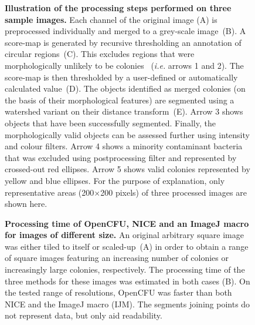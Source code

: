 \documentclass[10pt]{article}
\newcommand{\IJM}{IJM}
\begin{document}
\newpage{}

\begin{figure}[!ht]
\begin{center}
\end{center}
\caption{{\bf Illustration of the processing steps performed on three sample images.}
Each channel of the original image (A) is preprocessed individually and merged
to a grey-scale image~(B).
A score-map is generated by recursive thresholding an annotation of circular regions~(C). 
This excludes regions that were morphologically unlikely to be colonies~
(\emph{i.e.} arrows 1 and 2).
The score-map is then thresholded by a user-defined or automatically calculated
value~(D).
The objects identified as merged colonies (on the basis of their morphological
features) are segmented using a watershed variant on their distance transform~(E).
Arrow 3 shows objects that have been successfully segmented. Finally, the morphologically valid objects can be assessed further using intensity and colour filters.
Arrow 4 shows a minority contaminant bacteria that was excluded using postprocessing filter and represented by crossed-out red ellipses. 
Arrow 5 shows valid colonies represented by yellow and blue ellipses.
For the purpose of explanation, only representative areas (200$\times{}$200 pixels)
of three processed images are shown here.}
\label{figPipeline}
\end{figure}

\newpage{}


\begin{figure}[!ht]

\begin{center}
\end{center}
\begin{center}
\end{center}
\caption{{\bf Processing time of OpenCFU, NICE\cite{clarke_lowcost_2010} and an ImageJ macro\cite{cai_optimized_2011} for images of
different size.} An original arbitrary square image was either tiled to itself
or scaled-up~(A) in order to obtain a range of square images featuring an
increasing number of colonies or increasingly large colonies, respectively. The
processing time of the three methods for these images was estimated in both cases (B).
On the tested range of resolutions, OpenCFU was faster than both NICE and the ImageJ macro (\IJM). 
The segments joining points do not represent data, but only aid readability.}
\label{figSpeed}
\end{figure}
\end{document}

